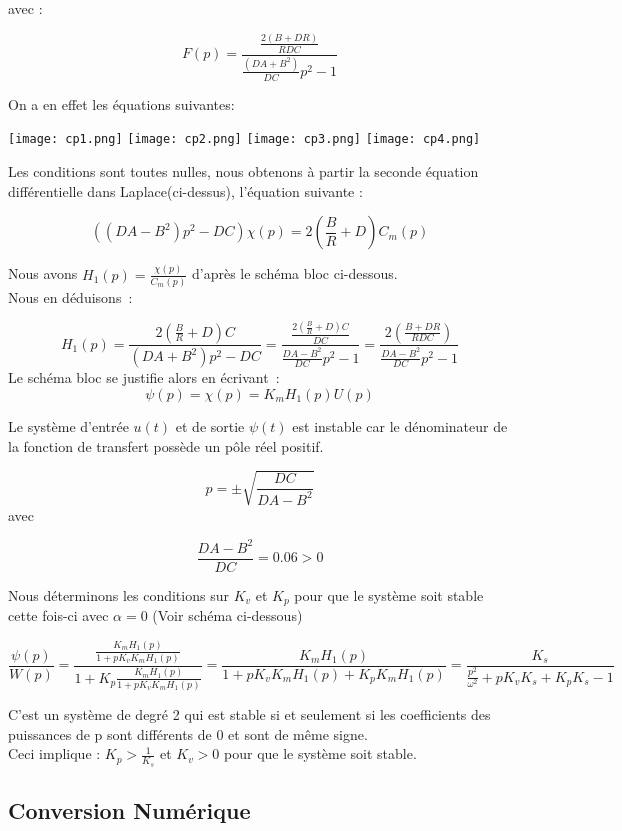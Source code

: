 \documentclass[oneside,a4paper,12pt]{article}
\begin{document}
	avec :
	
	$$ F(p) = \frac{\frac{2(B+DR)}{RDC}}{\frac{(DA+B^{2})}{DC}p^{2}-1} $$
	
	On a en effet les équations suivantes:
	
	
	\texttt{[image: cp1.png]}
	\texttt{[image: cp2.png]}
	\texttt{[image: cp3.png]}
	\texttt{[image: cp4.png]}
	
	Les conditions sont toutes nulles, nous obtenons à partir la seconde équation différentielle dans Laplace(ci-dessus), l’équation suivante : 
	
	$$ ((DA-B^{2})p^{2}-DC)\chi(p) = 2(\frac{B}{R}+D)C_{m}(p) $$
	
	Nous avons $ H_{1}(p) = \frac{\chi(p)}{C_{m}(p)}$ d’après le schéma bloc ci-dessous.\\
	Nous en déduisons :
	
	$$ H_{1}(p)=\frac{2(\frac{B}{R}+D)C}{(DA+B^{2})p^{2}-DC} = \frac{\frac{2(\frac{B}{R}+D)C}{DC}}{\frac{DA-B^{2}}{DC}p^{2}-1} = \frac{2(\frac{B+DR}{RDC})}{\frac{DA-B^{2}}{DC}p^{2}-1}$$
	Le schéma bloc se justifie alors en écrivant :
	$$ \psi(p) = \chi(p) = K_{m}H_{1}(p)U(p) $$
	
	Le système d’entrée $ u(t)$ et de sortie $\psi(t)$ est instable car le dénominateur de la fonction de transfert possède un pôle réel positif.
	
	$$ p=\pm\sqrt{\frac{DC}{DA-B^{2}}} $$
	avec 
	
	$$ \frac{DA-B^{2}}{DC}=0.06 > 0$$
	
	Nous déterminons les conditions sur $K_{v}$ et $K_{p}$ pour que le système soit stable cette fois-ci avec $\alpha = 0$ (Voir schéma ci-dessous)
	
	$$ \frac{\psi(p)}{W(p)} = \frac{\frac{K_{m}H_{1}(p)}{1+pK_{v}K_{m}H_{1}(p)}}{1+K_{p}\frac{K_{m}H_{1}(p)}{1+pK_{v}K_{m}H_{1}(p)}} = \frac{K_{m}H_{1}(p)}{1+pK_{v}K_{m}H_{1}(p)+K_{p}K_{m}H_{1}(p)} = \frac{K_{s}}{\frac{p^{2}}{\omega^{2}}+pK_{v}K_{s} + K_{p}K_{s}-1}$$
	
	C’est un système de degré 2 qui est stable si et seulement si les coefficients des puissances de p sont différents de 0 et sont de même signe.\\
	Ceci implique : $K_{p} > \frac{1}{K_{s}} $ et $ K_{v}>0 $ pour que le système soit stable.
	
	\subsection{Conversion Numérique}
	
\end{document}
